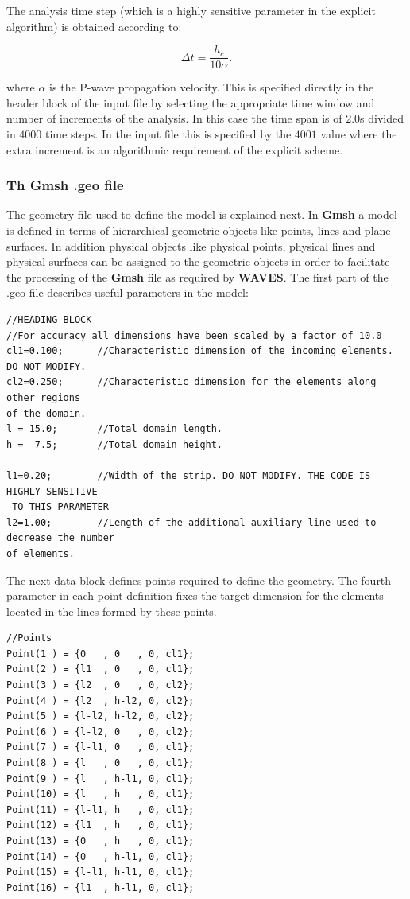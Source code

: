 \documentclass[12pt,letterpaper]{article}
\begin{document}
The analysis time step (which is a highly sensitive parameter in the explicit algorithm) is obtained according to:

\begin{equation}
\Delta t = \frac{{{h_c}}}{{10\alpha }}.
\end{equation}

where $\alpha$ is the P-wave propagation velocity. This is specified directly in the header block of the input file by selecting the appropriate time window and number of increments of the analysis. In this case the time span is of $2.0$s divided in $4000$ time steps. In the input file this is specified by the $4001$ value where the extra increment is an algorithmic requirement of the explicit scheme.


\subsubsection*{Th Gmsh .geo file}
The geometry file used to define the model is explained next. In {\bf Gmsh} a model is defined in terms of hierarchical geometric objects like points, lines and plane surfaces. In addition physical objects like physical points, physical lines and physical surfaces can be assigned to the geometric objects in order to facilitate the processing of the {\bf Gmsh} file as required by {\bf WAVES}. The first part of the .geo file describes useful parameters in the model:

\begin{verbatim}
//HEADING BLOCK
//For accuracy all dimensions have been scaled by a factor of 10.0
cl1=0.100;		//Characteristic dimension of the incoming elements. DO NOT MODIFY.
cl2=0.250;		//Characteristic dimension for the elements along other regions
of the domain.
l = 15.0;		//Total domain length.
h =  7.5;		//Total domain height.

l1=0.20;		//Width of the strip. DO NOT MODIFY. THE CODE IS HIGHLY SENSITIVE
 TO THIS PARAMETER
l2=1.00;		//Length of the additional auxiliary line used to decrease the number
of elements.
\end{verbatim}

The next data block defines points required to define the geometry. The fourth parameter in each point definition fixes the target dimension for the elements located in the lines formed by these points.

\begin{verbatim}
//Points
Point(1 ) = {0   , 0   , 0, cl1};
Point(2 ) = {l1  , 0   , 0, cl1};
Point(3 ) = {l2  , 0   , 0, cl2};
Point(4 ) = {l2  , h-l2, 0, cl2};
Point(5 ) = {l-l2, h-l2, 0, cl2};
Point(6 ) = {l-l2, 0   , 0, cl2};
Point(7 ) = {l-l1, 0   , 0, cl1};
Point(8 ) = {l   , 0   , 0, cl1};
Point(9 ) = {l   , h-l1, 0, cl1};
Point(10) = {l   , h   , 0, cl1};
Point(11) = {l-l1, h   , 0, cl1};
Point(12) = {l1  , h   , 0, cl1};
Point(13) = {0   , h   , 0, cl1};
Point(14) = {0   , h-l1, 0, cl1};
Point(15) = {l-l1, h-l1, 0, cl1};
Point(16) = {l1  , h-l1, 0, cl1};
\end{verbatim}
\end{document}
